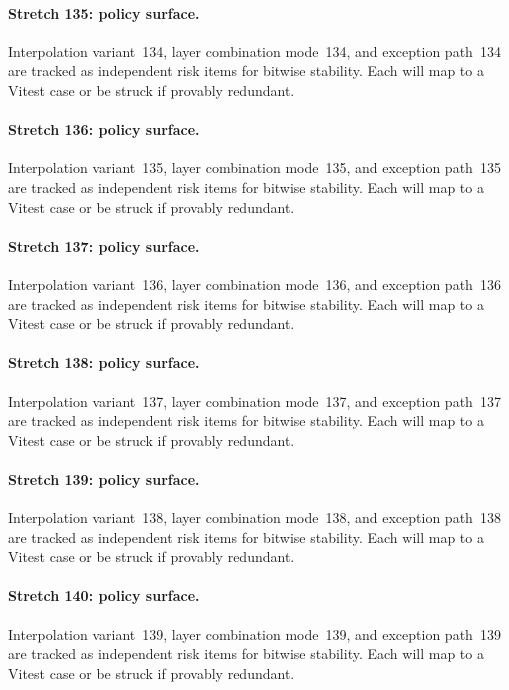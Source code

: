 \documentclass[sigconf,nonacm]{acmart}
\begin{document}
\paragraph{Stretch 135: policy surface.}
Interpolation variant~134, layer combination mode~134, and exception path~134 are tracked as independent risk items for bitwise stability. Each will map to a Vitest case or be struck if provably redundant. %

\paragraph{Stretch 136: policy surface.}
Interpolation variant~135, layer combination mode~135, and exception path~135 are tracked as independent risk items for bitwise stability. Each will map to a Vitest case or be struck if provably redundant. %

\paragraph{Stretch 137: policy surface.}
Interpolation variant~136, layer combination mode~136, and exception path~136 are tracked as independent risk items for bitwise stability. Each will map to a Vitest case or be struck if provably redundant. %

\paragraph{Stretch 138: policy surface.}
Interpolation variant~137, layer combination mode~137, and exception path~137 are tracked as independent risk items for bitwise stability. Each will map to a Vitest case or be struck if provably redundant. %

\paragraph{Stretch 139: policy surface.}
Interpolation variant~138, layer combination mode~138, and exception path~138 are tracked as independent risk items for bitwise stability. Each will map to a Vitest case or be struck if provably redundant. %

\paragraph{Stretch 140: policy surface.}
Interpolation variant~139, layer combination mode~139, and exception path~139 are tracked as independent risk items for bitwise stability. Each will map to a Vitest case or be struck if provably redundant. %
\end{document}
